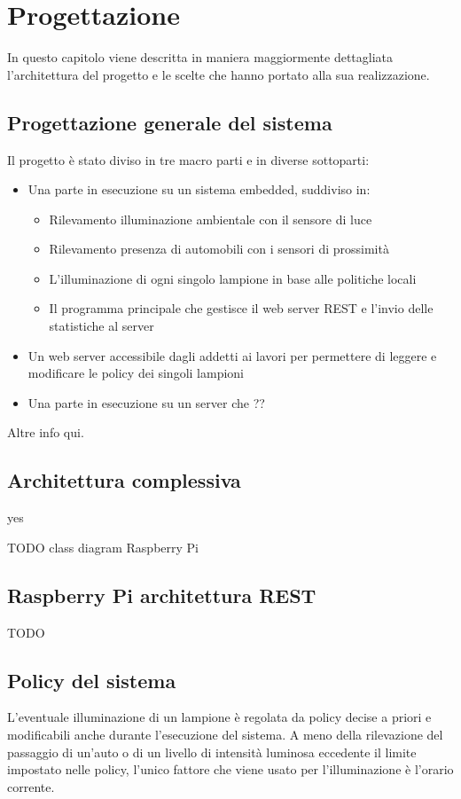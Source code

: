 \chapter{Progettazione}

In questo capitolo viene descritta in maniera maggiormente dettagliata l'architettura del progetto e le scelte che hanno portato alla sua realizzazione.

\section{Progettazione generale del sistema}

Il progetto è stato diviso in tre macro parti e in diverse sottoparti: 
\begin{itemize}
	\item Una parte in esecuzione su un sistema embedded, suddiviso in:
	\begin{itemize}
		\item Rilevamento illuminazione ambientale con il sensore di luce
		\item Rilevamento presenza di automobili con i sensori di prossimità
		\item L'illuminazione di ogni singolo lampione in base alle politiche locali 
		\item Il programma principale che gestisce il web server REST e l'invio delle statistiche al server
	\end{itemize}
	\item Un web server accessibile dagli addetti ai lavori per permettere di leggere e modificare le policy dei singoli lampioni
	\item Una parte in esecuzione su un server che ??
\end{itemize}

Altre info qui.

\section{Architettura complessiva}

yes

TODO class diagram Raspberry Pi

\section{Raspberry Pi architettura REST}
TODO

\section{Policy del sistema}
L'eventuale illuminazione di un lampione è regolata da policy decise a priori e modificabili anche durante l'esecuzione del sistema.
A meno della rilevazione del passaggio di un'auto o di un livello di intensità luminosa eccedente il limite impostato nelle policy, l'unico fattore che viene usato per l'illuminazione è l'orario corrente.


